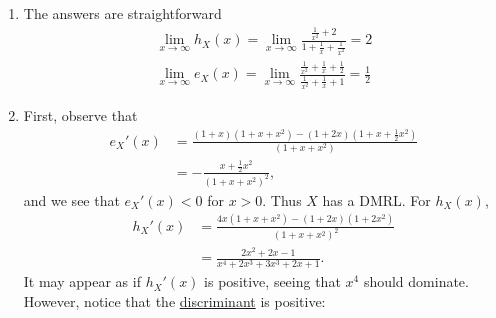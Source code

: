 \documentclass[notoc,notitlepage]{tufte-book}
\begin{document}
\begin{solution}
\begin{enumerate}
    \item The answers are straightforward
      \begin{gather*}
        \lim_{x \to \infty} h_X(x) = \lim_{x \to \infty} \frac{\frac{1}{x^2} + 2}{1 + \frac{1}{x} + \frac{1}{x^2}} = 2 \\
        \lim_{x \to \infty} e_X(x) = \lim_{x \to \infty} \frac{\frac{1}{x^2} + \frac{1}{x} + \frac{1}{2}}{\frac{1}{x^2} + \frac{1}{x} + 1} = \frac{1}{2}
      \end{gather*}

    \item First, observe that
      \begin{align*}
        e_X'(x) &= \frac{(1 + x)\left( 1 + x + x^2 \right) - (1 + 2x)\left( 1 + x + \frac{1}{2}x^2 \right)}{(1 + x + x^2)} \\
                &= - \frac{x + \frac{1}{2}x^2}{(1 + x + x^2)^2},
      \end{align*}
      and we see that $e_X'(x) < 0$ for $x > 0$. Thus $X$ has a DMRL. For $h_X(x)$,
      \begin{align*}
        h_X'(x) &= \frac{4x \left( 1 + x + x^2 \right) - (1 + 2x) \left( 1 + 2x^2 \right)}{\left(1 + x + x^2\right)^2} \\
                &= \frac{2x^2 + 2x - 1}{x^4 + 2x^3 + 3x^3 + 2x + 1}.
      \end{align*}
      It may appear as if $h_X'(x)$ is positive, seeing that $x^4$ should dominate. However, notice that the \href{https://en.wikipedia.org/wiki/Quadratic_equation\#Discriminant}{discriminant} is positive:
\end{enumerate}
\end{solution}
\end{document}
